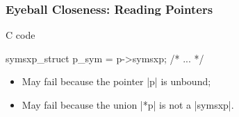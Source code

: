 \documentclass{beamer}
\begin{document}
\begin{frame}[fragile]
    \label{frame:reading:pointers}
    \frametitle{Eyeball Closeness: Reading Pointers}

    \begin{changemargin}{-5mm}{-5mm}

\begin{minipage}{.6\textwidth}
    {C code}
\begin{ccode}
symsxp_struct p_sym = p->symsxp;
/* ... */
\end{ccode}
\end{minipage}
    \begin{minipage}{.45\textwidth}
    \begin{itemize}
        \item May fail because the pointer \mintedinlinespacebug\cinline|p| is unbound;
        \item May fail because the union \mintedinlinespacebug\cinline|*p| is not a \mintedinlinespacebug\cinline|symsxp|.
    \end{itemize}
    \end{minipage}

\vfill


\end{changemargin}
\end{frame}
\end{document}
